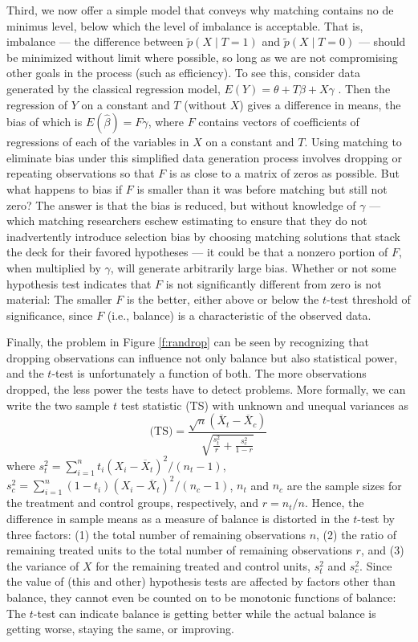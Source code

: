 \documentclass[11pt,titlepage]{article}
\begin{document}
Third, we now offer a simple model that conveys why matching contains
no de minimus level, below which the level of imbalance is acceptable.
That is, imbalance --- the difference between $\tilde p(X\mid T=1)$
and $\tilde p(X\mid T=0)$ --- should be minimized without limit where
possible, so long as we are not compromising other goals in the
process (such as efficiency).  To see this, consider data generated by
the classical regression model, $E(Y)= \theta + T\beta + X\gamma$
\citep{Goldberger91}.  Then the regression of $Y$ on a constant and
$T$ (without $X$) gives a difference in means, the bias of which is
$E(\hat\beta) = F\gamma$, where $F$ contains vectors of coefficients
of regressions of each of the variables in $X$ on a constant and $T$.
Using matching to eliminate bias under this simplified data generation
process involves dropping or repeating observations so that $F$ is as
close to a matrix of zeros as possible.  But what happens to bias if
$F$ is smaller than it was before matching but still not zero?  The
answer is that the bias is reduced, but without knowledge of $\gamma$
--- which matching researchers eschew estimating to ensure that they
do not inadvertently introduce selection bias by choosing matching
solutions that stack the deck for their favored hypotheses --- it
could be that a nonzero portion of $F$, when multiplied by $\gamma$,
will generate arbitrarily large bias.  Whether or not some hypothesis
test indicates that $F$ is not significantly different from zero is
not material: The smaller $F$ is the better, either above or below the
$t$-test threshold of significance, since $F$ (i.e., balance) is a
characteristic of the observed data.

Finally, the problem in Figure \ref{f:randrop} can be seen by
recognizing that dropping observations can influence not only balance
but also statistical power, and the $t$-test is unfortunately a
function of both.  The more observations dropped, the less power the
tests have to detect problems.  More formally, we can write the two
sample $t$ test statistic (TS) with unknown and unequal variances as
\begin{equation}
  \label{ttest}
\text{(TS)} = \frac{\sqrt{n}(\overline{X}_t-\overline{X}_c)}
               {\sqrt{\frac{s^2_t}{r} + \frac{s^2_c}{1-r}}}
\end{equation}
where $s^2_t=\sum_{i=1}^n t_i(X_i - \overline{X}_t)^2/(n_t-1)$,
$s^2_c=\sum_{i=1}^n (1-t_i)(X_i - \overline{X}_t)^2/(n_c-1)$, $n_t$
and $n_c$ are the sample sizes for the treatment and control groups,
respectively, and $r=n_t/n$.  Hence, the difference in sample means as
a measure of balance is distorted in the $t$-test by three factors:
(1) the total number of remaining observations $n$, (2) the ratio of
remaining treated units to the total number of remaining observations
$r$, and (3) the variance of $X$ for the remaining treated and control
units, $s_t^2$ and $s_c^2$.  Since the value of (this and other)
hypothesis tests are affected by factors other than balance, they
cannot even be counted on to be monotonic functions of balance: The
$t$-test can indicate balance is getting better while the actual
balance is getting worse, staying the same, or improving.
\end{document}
